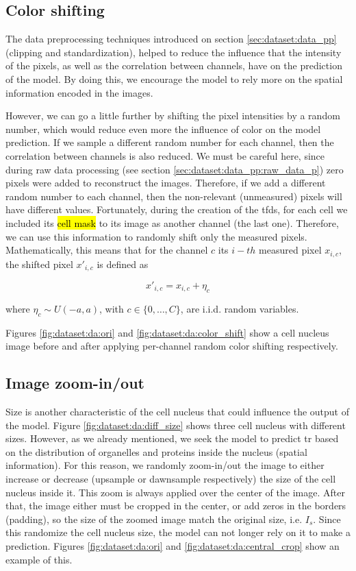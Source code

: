 \subsection{Color shifting}

The data preprocessing techniques introduced on section \ref{sec:dataset:data_pp} (clipping and standardization), helped to reduce the influence that the intensity of the pixels, as well as the correlation between channels, have on the prediction of the model. By doing this, we encourage the model to rely more on the spatial information encoded in the images.

However, we can go a little further by shifting the pixel intensities by a random number, which would reduce even more the influence of color on the model prediction. If we sample a different random number for each channel, then the correlation between channels is also reduced. We must be careful here, since during raw data processing (see section \ref{sec:dataset:data_pp:raw_data_p}) zero pixels were added to reconstruct the images. Therefore, if we add a different random number to each channel, then the non-relevant (unmeasured) pixels will have different values. Fortunately, during the creation of the \gls{tfds}, for each cell we included its \hl{cell mask} to its image as another channel (the last one). Therefore, we can use this information to randomly shift only the measured pixels. Mathematically, this means that for the channel $c$ its $i-th$ measured pixel $x_{i,c}$, the shifted pixel $x'_{i,c}$ is defined as

\begin{equation}
  x'_{i,c} = x_{i,c} + \eta_c
\end{equation}

\noindent where $\eta_c \sim U(-a, a)$, with $c\in\{0, \dots, C\}$, are i.i.d. random variables.

Figures \ref{fig:dataset:da:ori} and \ref{fig:dataset:da:color_shift} show a cell nucleus image before and after applying per-channel random color shifting respectively.

\subsection{Image zoom-in/out}

Size is another characteristic of the cell nucleus that could influence the output of the model. Figure \ref{fig:dataset:da:diff_size} shows three cell nucleus with different sizes. However, as we already mentioned, we seek the model to predict \gls{tr} based on the distribution of organelles and proteins inside the nucleus (spatial information). For this reason, we randomly zoom-in/out the image to either increase or decrease (upsample or dawnsample respectively) the size of the cell nucleus inside it. This zoom is always applied over the center of the image. After that, the image either must be cropped in the center, or add zeros in the borders (padding), so the size of the zoomed image match the original size, i.e. $I_s$. Since this randomize the cell nucleus size, the model can not longer rely on it to make a prediction. Figures \ref{fig:dataset:da:ori} and \ref{fig:dataset:da:central_crop} show an example of this.

